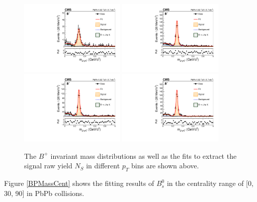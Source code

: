 \begin{figure}[h]
\begin{center}
\includegraphics[width= 0.45\textwidth]{Figures/Chapter5/data_PbPb_1_Bpt_710_doubly0_0_90_ntKp.pdf}
\includegraphics[width= 0.45\textwidth]{Figures/Chapter5/data_PbPb_2_Bpt_1015_doubly0_0_90_ntKp.pdf}
\includegraphics[width= 0.45\textwidth]{Figures/Chapter5/data_PbPb_3_Bpt_1520_doubly0_0_90_ntKp.pdf}
\includegraphics[width= 0.45\textwidth]{Figures/Chapter5/data_PbPb_4_Bpt_2050_doubly0_0_90_ntKp.pdf}
\caption{The $B^+$ invariant mass distributions as well as the fits to extract the signal raw yield $N_{S}$ in different $p_T$ bins are shown above.}
\label{BPMassPt}
\end{center}
\end{figure}

Figure \ref{BPMassCent} shows the fitting results of $B^0_s$ in the centrality range of [0, 30, 90] in PbPb collisions.  

